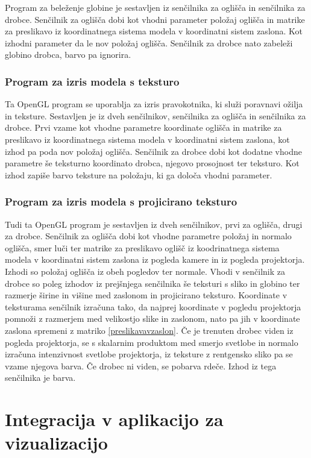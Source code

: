 \documentclass[a4paper, 12pt]{book}
\begin{document}
Program za beleženje globine je sestavljen iz senčilnika za oglišča in senčilnika za drobce. Senčilnik za oglišča dobi kot vhodni parameter položaj oglišča in matrike za preslikavo iz koordinatnega sistema modela v koordinatni sistem zaslona. Kot izhodni parameter da le nov položaj oglišča. Senčilnik za drobce nato zabeleži globino drobca, barvo pa ignorira.

\subsubsection*{Program za izris modela s teksturo}

Ta OpenGL program se uporablja za izris pravokotnika, ki služi poravnavi ožilja in teksture. Sestavljen je iz dveh senčilnikov, senčilnika za oglišča in senčilnika za drobce. Prvi vzame kot vhodne parametre koordinate oglišča in matrike za preslikavo iz koordinatnega sistema modela v koordinatni sistem zaslona, kot izhod pa poda nov položaj oglišča. Senčilnik za drobce dobi kot dodatne vhodne parametre še teksturno koordinato drobca, njegovo prosojnost ter teksturo. Kot izhod zapiše barvo teksture na položaju, ki ga določa vhodni parameter.

\subsubsection*{Program za izris modela s projicirano teksturo}

Tudi ta OpenGL program je sestavljen iz dveh senčilnikov, prvi za oglišča, drugi za drobce. Senčilnik za oglišča dobi kot vhodne parametre položaj in normalo oglišča, smer luči ter matrike za preslikavo oglišč iz koodrinatnega sistema modela v koordinatni sistem zaslona iz pogleda kamere in iz pogleda projektorja. Izhodi so položaj oglišča iz obeh pogledov ter normale. Vhodi v senčilnik za drobce so poleg izhodov iz prejšnjega senčilnika še teksturi s sliko in globino ter razmerje širine in višine med zaslonom in projicirano teksturo. Koordinate v teksturama senčilnik izračuna tako, da najprej koordinate v pogledu projektorja pomnoži z razmerjem med velikostjo slike in zaslonom, nato pa jih v koordinate zaslona spremeni z matriko \ref{preslikavavzaslon}. Če je trenuten drobec viden iz pogleda projektorja, se s skalarnim produktom med smerjo svetlobe in normalo izračuna intenzivnost svetlobe projektorja, iz teksture z rentgensko sliko pa se vzame njegova barva. Če drobec ni viden, se pobarva rdeče. Izhod iz tega senčilnika je barva.


\section{Integracija v aplikacijo za vizualizacijo}
\end{document}
